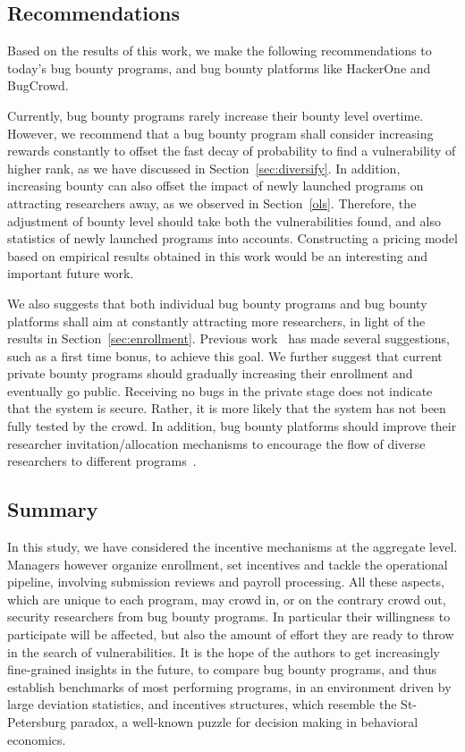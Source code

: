 \subsection{Recommendations}

Based on the results of this work, we make the following recommendations to today's bug bounty programs, and bug bounty platforms like HackerOne and BugCrowd.

Currently, bug bounty programs rarely increase their bounty level overtime. However, we recommend that a bug bounty program shall consider increasing rewards constantly to offset the fast decay of probability to find a vulnerability of higher rank, as we have discussed in Section~\ref{sec:diversify}. In addition, increasing bounty can also offset the impact of newly launched programs on attracting researchers away, as we observed in Section~\ref{ols}. Therefore, the adjustment of bounty level should take both the vulnerabilities found, and also statistics of newly launched programs into accounts. Constructing a pricing model based on empirical results obtained in this work would be an interesting and important future work.

We also suggests that both individual bug bounty programs and bug bounty platforms shall aim at constantly attracting more researchers, in light of the results in Section~\ref{sec:enrollment}. Previous work~\cite{zhao2015empirical} has made several suggestions, such as a first time bonus, to achieve this goal. We further suggest that current private bounty programs should gradually increasing their enrollment and eventually go public. Receiving no bugs in the private stage does not indicate that the system is secure. Rather, it is more likely that the system has not been fully tested by the crowd. In addition, bug bounty platforms should improve their researcher invitation/allocation mechanisms to encourage the flow of diverse researchers to different programs~\cite{zhao2016crowdsourced}.

\subsection{Summary}

In this study, we have considered the incentive mechanisms at the aggregate level. Managers however organize enrollment, set incentives and tackle the operational pipeline, involving submission reviews and payroll processing. All these aspects, which are unique to each program, may crowd in, or on the contrary crowd out, security researchers from bug bounty programs. In particular their willingness to participate will be affected, but also the amount of effort they are ready to throw in the search of vulnerabilities. It is the hope of the authors to get increasingly fine-grained insights in the future, to compare bug bounty programs, and thus establish benchmarks of most performing programs, in an environment driven by large deviation statistics, and incentives structures, which resemble the St-Petersburg paradox, a well-known puzzle for decision making in behavioral economics.
